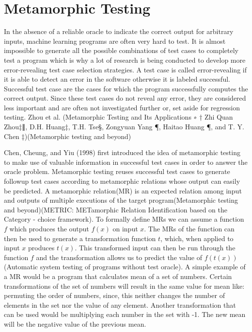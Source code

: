 \section{Metamorphic Testing}

In the absence of a reliable oracle to indicate the correct output for arbitrary inputs, machine learning programs are often very hard to test. It is almost impossible to generate all the possible combinations of test cases to completely test a program which is why a lot of research is being conducted to develop more error-revealing test case selection strategies. A test case is called error-revealing if it is able to detect an error in the software otherwise it is labeled successful. Successful test case are the cases for which the program successfully computes the correct output. Since these test cases do not reveal any error, they are considered less important and are often not investigated further or, set aside for regression testing. {Zhou et al. (Metamorphic Testing and Its Applications ∗ † Zhi Quan Zhou‡∥, D.H. Huang‡, T.H. Tse§, Zongyuan Yang ¶, Haitao Huang ¶, and T. Y. Chen ‡)(Metamorphic testing and beyond) }

Chen, Cheung, and Yiu (1998) first introduced the idea of metamorphic testing to make use of valuable information in successful test cases in order to answer the oracle problem. Metamorphic testing reuses successful test cases to generate followup test cases according to metamorphic relations whose output can easily be predicted. A metamorphic relation(MR) is an expected relation among input and outputs of multiple executions of the target program(Metamorphic testing and beyond)(METRIC: METamorphic Relation Identification based on the Category - choice framework). To formally define MRs we can assume a function $f$ which produces the output $f(x)$ on input $x$. The MRs of the function can then be used to generate a transformation function $t$, which, when applied to input $x$ produces $t(x)$. This transformed input can then be run through the function $f$ and the transformation allows us to predict the value of $f(t(x))$(Automatic system testing of programs without test oracle). 
A simple example of a MR would be a program that calculates mean of a set of numbers. Certain transformations of the set of numbers will result in the same value for mean like: permuting the order of numbers, since, this neither changes the number of elements in the set nor the value of any element. Another transformation that can be used would be multiplying each number in the set with -1. The new mean will be the negative value of the previous mean.

